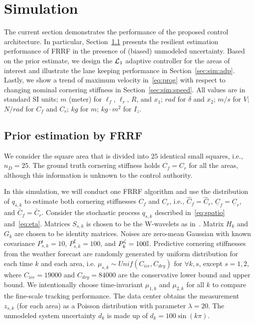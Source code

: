 \documentclass[letterpaper, 10 pt, conference]{ieeeconf}
\begin{document}


\section{Simulation}\label{sec:simul}

The current section demonstrates the performance of the proposed control architecture. In particular, Section~\ref{sec:sim:pri} presents the resilient estimation performance of FRRF in the presence of (biased) unmodeled uncertainty.
Based on the prior estimate, we design the $\mathcal{L}_1$ adaptive controller for the areas of interest and illustrate the lane keeping performance in Section~\ref{sec:sim:adp}. Lastly, we show a trend of maximum velocity in~\eqref{eq:prog} with respect to changing nominal cornering stiffness in Section~\ref{sec:sim:speed}.
All values are in standard SI units; $m$ (meter) for $\ell_f$, $\ell_r$, $R$, and $x_1$; $rad$ for $\delta$ and $x_2$; $m/s$ for $V$; $N/rad$ for $C_f$ and $C_r$; $kg$ for $m$; $kg \cdot m^2$ for $I_z$.

\subsection{Prior estimation by FRRF}\label{sec:sim:pri}

We consider the square area that is divided into $25$ identical small squares, i.e., $n_D=25$. The ground truth cornering stiffness holds $C_f =  C_r$ for all the areas, although this information is unknown to the control authority.

In this simulation, we will conduct one FRRF algorithm and use the distribution of $q_{s,k}$ to estimate both cornering stiffnesses $C_f$ and $C_r$, i.e., $\hat{C}_f=\hat{C}_r$, $\underline{C}_f=\underline{C}_r$, and $\bar{C}_f=\bar{C}_r$.
Consider the stochastic process $q_{s,k}$ described in~\eqref{eq:spatio} and~\eqref{eq:eta}.
Matrices $S_{s,k}$ is chosen to be the W-wavelets as in~\cite{cressie2010fixed,kwong1994w}. Matrix $H_k$ and $G_k$ are chosen to be identity matrices.
Noises are zero-mean Gaussian with known covariance $P_{s,k}^{\epsilon}=10$, $P_{s,k}^{\xi}=100$, and $P_{k}^{\zeta}=100\mathbb{I}$.
Predictive cornering stiffnesses from the weather forecast are randomly generated by uniform distribution for each time $k$ and each area, i.e. $\mu_{s,k} \sim Unif(C_{ice}, C_{dry})$ for $\forall k,s$, except $s=1,2$, where $C_{ice} = 19000$ and $C_{dry} = 84000$ are the conservative lower bound and upper bound.
We intentionally choose time-invariant $\mu_{1,k}$ and $\mu_{2,k}$ for all $k$ to compare the fine-scale tracking performance.
The data center obtains the measurement $z_{s,k}$ (for each area) as a Poisson distribution with parameter $\lambda=20$. The unmodeled system uncertainty $d_k$ is made up of $d_k = 100\sin(k\pi)$.
\end{document}
